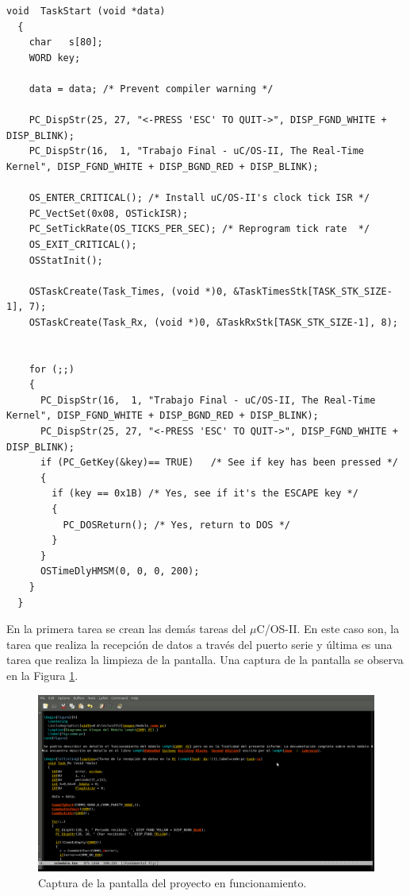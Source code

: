 \documentclass[11pt,a4paper,oneside]{article}
\def\uCOS{$\mu$C/OS-II\texttrademark}
\begin{document}
\begin{lstlisting}[caption={Primera tarea del \uCOS sobre la PC (\emph{TaskStart()})},label=code:pc-taskstart]
  void  TaskStart (void *data)
  {
    char   s[80];
    WORD key;
    
    data = data; /* Prevent compiler warning */
    
    PC_DispStr(25, 27, "<-PRESS 'ESC' TO QUIT->", DISP_FGND_WHITE + DISP_BLINK);
    PC_DispStr(16,  1, "Trabajo Final - uC/OS-II, The Real-Time Kernel", DISP_FGND_WHITE + DISP_BGND_RED + DISP_BLINK);
    
    OS_ENTER_CRITICAL(); /* Install uC/OS-II's clock tick ISR */
    PC_VectSet(0x08, OSTickISR);
    PC_SetTickRate(OS_TICKS_PER_SEC); /* Reprogram tick rate  */
    OS_EXIT_CRITICAL();
    OSStatInit();
    
    OSTaskCreate(Task_Times, (void *)0, &TaskTimesStk[TASK_STK_SIZE-1], 7);
    OSTaskCreate(Task_Rx, (void *)0, &TaskRxStk[TASK_STK_SIZE-1], 8);
    
    
    for (;;)
    {
      PC_DispStr(16,  1, "Trabajo Final - uC/OS-II, The Real-Time Kernel", DISP_FGND_WHITE + DISP_BGND_RED + DISP_BLINK);
      PC_DispStr(25, 27, "<-PRESS 'ESC' TO QUIT->", DISP_FGND_WHITE + DISP_BLINK);
      if (PC_GetKey(&key)== TRUE)	/* See if key has been pressed */
      {
        if (key == 0x1B) /* Yes, see if it's the ESCAPE key */
        {
          PC_DOSReturn(); /* Yes, return to DOS */
        }
      }
      OSTimeDlyHMSM(0, 0, 0, 200);
    }
  }  
\end{lstlisting}

En la primera tarea se crean las demás tareas del \uCOS. En este caso son, la tarea que realiza la recepción de datos a través del puerto serie y última es una tarea que realiza la limpieza de la pantalla. Una captura de la pantalla se observa en la Figura \ref{fig:captura-pantalla-ucos}. 


\begin{figure}[h]
  \centering
  \includegraphics[width=\textwidth]{images/captura-pantalla-ucos}
  \caption{Captura de la pantalla del proyecto en funcionamiento.}
  \label{fig:captura-pantalla-ucos}
\end{figure}
\end{document}
